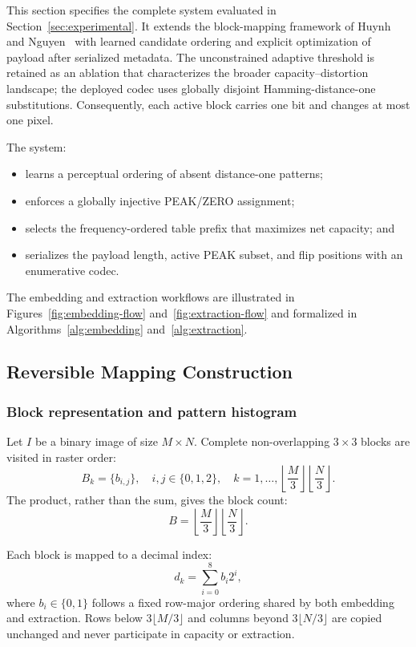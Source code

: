 \documentclass[a4paper,fleqn]{cas-dc}
\begin{document}
This section specifies the complete system evaluated in
Section~\ref{sec:experimental}. It extends the block-mapping framework of
Huynh and Nguyen~\cite{Huynh2025BlockMapping} with learned candidate ordering and explicit
optimization of payload after serialized metadata. The unconstrained adaptive
threshold is retained as an ablation that characterizes the broader
capacity--distortion landscape; the deployed codec uses globally disjoint
Hamming-distance-one substitutions. Consequently, each active block carries
one bit and changes at most one pixel.

The system:
\begin{itemize}
    \item learns a perceptual ordering of absent distance-one patterns;
    \item enforces a globally injective PEAK/ZERO assignment;
    \item selects the frequency-ordered table prefix that maximizes net
    capacity; and
    \item serializes the payload length, active PEAK subset, and flip positions
    with an enumerative codec.
\end{itemize}

The embedding and extraction workflows are illustrated in
Figures~\ref{fig:embedding-flow} and~\ref{fig:extraction-flow} and formalized
in Algorithms~\ref{alg:embedding} and~\ref{alg:extraction}.

\subsection{Reversible Mapping Construction}

\subsubsection*{Block representation and pattern histogram}

Let $I$ be a binary image of size $M\times N$. Complete non-overlapping
$3\times3$ blocks are visited in raster order:
\[
B_k=\{b_{i,j}\},\quad i,j\in\{0,1,2\},\quad
k=1,\ldots,\left\lfloor\frac{M}{3}\right\rfloor
\left\lfloor\frac{N}{3}\right\rfloor .
\]
The product, rather than the sum, gives the block count:
\[
B=\left\lfloor\frac{M}{3}\right\rfloor
  \left\lfloor\frac{N}{3}\right\rfloor .
\]

Each block is mapped to a decimal index:
\[
d_k = \sum_{i=0}^{8} b_i 2^i,
\]
where $b_i \in \{0,1\}$ follows a fixed row-major ordering shared by both embedding and extraction.
Rows below $3\lfloor M/3\rfloor$ and columns beyond
$3\lfloor N/3\rfloor$ are copied unchanged and never participate in capacity
or extraction.
\end{document}
